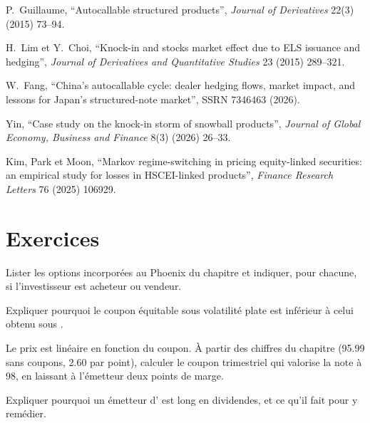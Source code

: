 \begin{omsources}
\item P.~Guillaume, ``Autocallable structured products'', \emph{Journal of Derivatives} 22(3) (2015) 73--94.
\item H.~Lim et Y.~Choi, ``Knock-in and stocks market effect due to ELS issuance and hedging'', \emph{Journal of Derivatives and
Quantitative Studies} 23 (2015) 289--321.
\item W.~Fang, ``China's autocallable cycle: dealer hedging flows, market impact, and lessons for Japan's structured-note market'',
SSRN 7346463 (2026).
\item Yin, ``Case study on the knock-in storm of snowball products'', \emph{Journal of Global Economy, Business and Finance} 8(3) (2026)
26--33.
\item Kim, Park et Moon, ``Markov regime-switching in pricing equity-linked securities: an empirical study for losses in HSCEI-linked
products'', \emph{Finance Research Letters} 76 (2025) 106929.
\end{omsources}

\section{Exercices}

\begin{exercise}[$\star$]\label{exo:dv:autocallables:1}
Lister les options incorporées au Phoenix du chapitre et indiquer, pour chacune, si l'investisseur est acheteur ou vendeur.
\end{exercise}

\begin{exercise}[$\star$]\label{exo:dv:autocallables:2}
Expliquer pourquoi le coupon équitable sous volatilité plate est inférieur à celui obtenu sous .
\end{exercise}

\begin{exercise}[$\star$]\label{exo:dv:autocallables:3}
Le prix est linéaire en fonction du coupon. À partir des chiffres du chapitre (95.99 sans coupons, 2.60 par point), calculer le coupon trimestriel
qui valorise la note à 98, en laissant à l'émetteur deux points de marge.
\end{exercise}

\begin{exercise}[$\star\star$]\label{exo:dv:autocallables:4}
Expliquer pourquoi un émetteur d' est long en dividendes, et ce qu'il fait pour y remédier.
\end{exercise}

